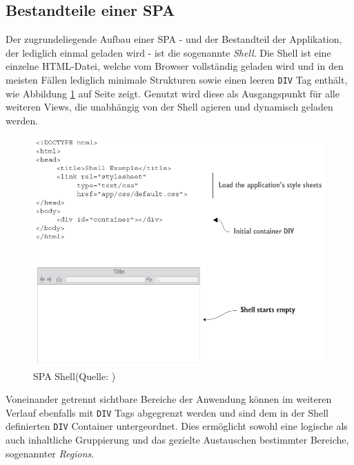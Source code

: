 \documentclass[a4paper,12pt,twoside]{scrreprt}
\begin{document}
\subsection{Bestandteile einer \acs{SPA}}
\label{subsec:spa-bestandteile}
Der zugrundeliegende Aufbau einer \ac{SPA} - und der Bestandteil der Applikation, der lediglich einmal geladen wird - ist die sogenannte \textit{Shell}. Die Shell ist eine einzelne HTML-Datei, welche vom Browser vollständig geladen wird und in den meisten Fällen lediglich minimale Strukturen sowie einen leeren \texttt{DIV} Tag enthält, wie Abbildung \ref{fig:spa-shell} auf Seite \pageref{fig:spa-overview} zeigt. Genutzt wird diese als Ausgangspunkt für alle weiteren Views, die unabhängig von der Shell agieren und dynamisch geladen werden. \parencite[][Seite 8]{scott_spa_2015}

\begin{figure}[ht]
    \centering
    \includegraphics[scale=0.5]{images/SPA_shell_Scott.png}
    \caption[\acs{SPA} Shell]{\acs{SPA} Shell\newline(Quelle: \cite[][Seite 8]{scott_spa_2015})}
    \label{fig:spa-shell}
\end{figure}

Voneinander getrennt sichtbare Bereiche der Anwendung können im weiteren Verlauf ebenfalls mit \texttt{DIV} Tags abgegrenzt werden und sind dem in der Shell definierten \texttt{DIV} Container untergeordnet. Dies ermöglicht sowohl eine logische als auch inhaltliche Gruppierung und das gezielte Austauschen bestimmter Bereiche, sogenannter \textit{Regions}. \parencite[][Seite 9]{scott_spa_2015}
\end{document}
